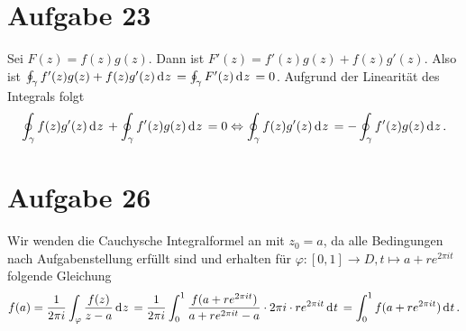 \documentclass{article}
\theoremstyle{definition}
\begin{document}
\section*{Aufgabe 23}
Sei $F(z) = f(z)g(z)$. Dann ist $F'(z) = f'(z)g(z) + f(z)g'(z)$. Also ist $\oint_\gamma f'(z)g(z) + f(z)g'(z) \d z = \oint_\gamma F'(z) \d z = 0$. Aufgrund der Linearität des Integrals folgt \[\oint_\gamma f(z)g'(z)\d z + \oint_\gamma f'(z)g(z) \d z= 0 \Leftrightarrow \oint_\gamma f(z)g'(z) \d z= - \oint_\gamma f'(z)g(z)\d z.\]

\section*{Aufgabe 26}
Wir wenden die Cauchysche Integralformel an mit $z_0 = a$, da alle Bedingungen nach Aufgabenstellung erfüllt sind und erhalten für $\varphi\colon [0,1] \to D, t \mapsto a + re^{2\pi i t}$ folgende Gleichung
\[f(a) = \frac{1}{2\pi i}\int_\varphi \frac{f(z)}{z-a}\d z = \frac{1}{2\pi i}\int_0^1 \frac{f(a + re^{2\pi i t})}{a + re^{2\pi i t} -a} \cdot 2\pi i\cdot re^{2\pi i t} \d t = \int_0^1 f(a + re^{2\pi i t}) \d t.\]
\end{document}
